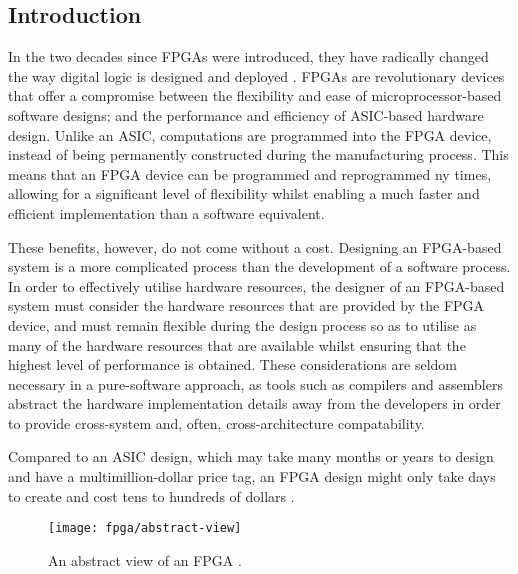 \subsection{Introduction}
\label{fpga:Introduction}
In the two decades since \glspl{FPGA} were introduced, they have radically
changed the way digital logic is designed and deployed \cite{Hauck:2007}.
\glspl{FPGA} are revolutionary devices that offer a compromise between the
flexibility and ease of microprocessor-based software designs; and the
performance and efficiency of \gls{ASIC}-based hardware design. Unlike an
\gls{ASIC}, computations are programmed into the \gls{FPGA} device, instead of
being permanently constructed during the manufacturing process. This means that
an \gls{FPGA} device can be programmed and reprogrammed ny times, allowing for
a significant level of flexibility whilst enabling a much faster and efficient
implementation than a software equivalent.

These benefits, however, do not come without a cost. Designing an
\gls{FPGA}-based system is a more complicated process than the development of a
software process. In order to effectively utilise hardware resources, the
designer of an \gls{FPGA}-based system must consider the hardware resources that
are provided by the \gls{FPGA} device, and must remain flexible during the
design process so as to utilise as many of the hardware resources that are
available whilst ensuring that the highest level of performance is obtained.
These considerations are seldom necessary in a pure-software approach, as tools
such as compilers and assemblers abstract the hardware implementation details
away from the developers in order to provide cross-system and, often,
cross-architecture compatability.

Compared to an \gls{ASIC} design, which may take many months or years to design
and have a multimillion-dollar price tag, an \gls{FPGA} design might only take
days to create and cost tens to hundreds of dollars \cite{Hauck:2007}.

\begin{figure}
    \centering
    \texttt{[image: fpga/abstract-view]}
    \caption[An abstract view of an \gls{FPGA}.]
        {An abstract view of an \gls{FPGA} \cite{Hauck:2007}.}
    \label{fig:fpga:abstract}
\end{figure}

